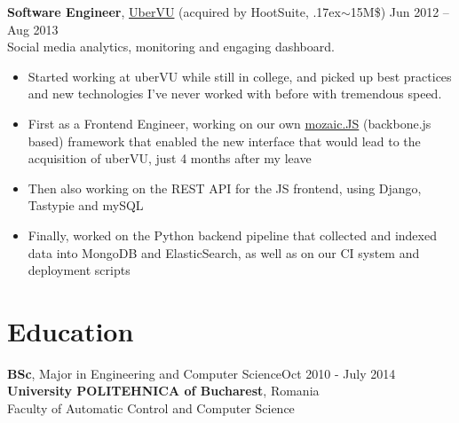 \documentclass[line, margin]{resume}
\newcommand{\bettertilde}{\raise.17ex\hbox{$\scriptstyle\mathtt{\sim}$}}
\begin{document}
\begin{resume}
\textbf{Software Engineer}, \href{http://ubervu.com}{UberVU} (acquired by HootSuite, \bettertilde15M\$) \hfill Jun 2012 -- Aug 2013\\
Social media analytics, monitoring and engaging dashboard.
\begin{itemize} \itemsep -2pt  %
	\item Started working at uberVU while still in college, and picked up best practices and new technologies I've never worked with before with tremendous speed.
	\item First as a Frontend Engineer, working on our own \href{https://github.com/uberVU/mozaic/}{mozaic.JS} (backbone.js based) framework that enabled the new interface that would lead to the acquisition of uberVU, just 4 months after my leave
    \item Then also working on the REST API for the JS frontend, using Django, Tastypie and mySQL
    \item Finally, worked on the Python backend pipeline that collected and indexed data into MongoDB and ElasticSearch, as well as on our CI system and deployment scripts
\end{itemize}



    \section{Education}


    \textbf{BSc}, Major in Engineering and Computer Science\hfill Oct 2010 - July 2014\\
    \textbf{University POLITEHNICA of Bucharest}, Romania\\
    Faculty of Automatic Control and Computer Science


\end{resume}
\end{document}
